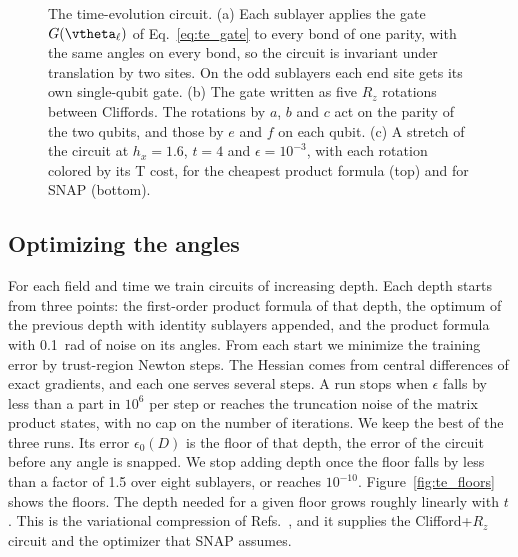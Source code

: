 \begin{figure}[t]
\centering
{}
\caption{The time-evolution circuit. (a) Each sublayer applies the gate $G(\vtheta_\ell)$ of Eq.~\eqref{eq:te_gate} to every bond of one parity, with the same angles on every bond, so the circuit is invariant under translation by two sites. On the odd sublayers each end site gets its own single-qubit gate. (b) The gate written as five $R_z$ rotations between Cliffords. The rotations by $a$, $b$ and $c$ act on the parity of the two qubits, and those by $e$ and $f$ on each qubit. (c) A stretch of the circuit at $h_x = 1.6$, $t = 4$ and $\epsilon = 10^{-3}$, with each rotation colored by its T cost, for the cheapest product formula (top) and for SNAP (bottom). }
\label{fig:te_circuit}
\end{figure}

\subsection{Optimizing the angles}
\label{sec:time_evolution_training}

For each field and time we train circuits of increasing depth. Each depth starts from three points: the first-order product formula of that depth, the optimum of the previous depth with identity sublayers appended, and the product formula with 0.1~rad of noise on its angles. From each start we minimize the training error by trust-region Newton steps. The Hessian comes from central differences of exact gradients, and each one serves several steps. A run stops when $\epsilon$ falls by less than a part in $10^{6}$ per step or reaches the truncation noise of the matrix product states, with no cap on the number of iterations. We keep the best of the three runs. Its error $\epsilon_0(D)$ is the floor of that depth, the error of the circuit before any angle is snapped. We stop adding depth once the floor falls by less than a factor of 1.5 over eight sublayers, or reaches $10^{-10}$. Figure~\ref{fig:te_floors} shows the floors. The depth needed for a given floor grows roughly linearly with $t$. This is the variational compression of Refs.~\cite{Lin2021compressed,McKeever2023classically,Gibbs2025deep,Gibbs2025infinite}, and it supplies the Clifford+$R_z$ circuit and the optimizer that SNAP assumes.

